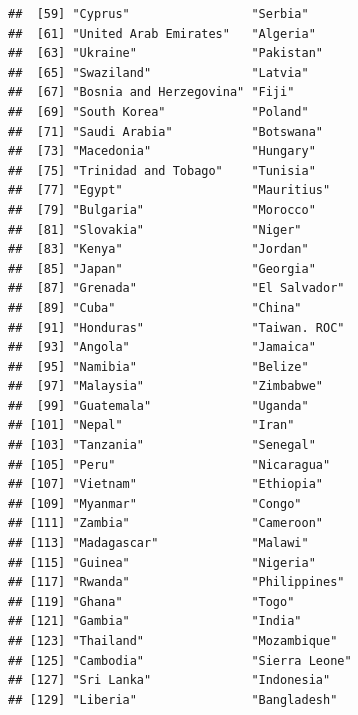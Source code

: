 \documentclass[ignorenonframetext,]{beamer}
\begin{document}
\begin{frame}[fragile]{}
\begin{verbatim}
##  [59] "Cyprus"                 "Serbia"                
##  [61] "United Arab Emirates"   "Algeria"               
##  [63] "Ukraine"                "Pakistan"              
##  [65] "Swaziland"              "Latvia"                
##  [67] "Bosnia and Herzegovina" "Fiji"                  
##  [69] "South Korea"            "Poland"                
##  [71] "Saudi Arabia"           "Botswana"              
##  [73] "Macedonia"              "Hungary"               
##  [75] "Trinidad and Tobago"    "Tunisia"               
##  [77] "Egypt"                  "Mauritius"             
##  [79] "Bulgaria"               "Morocco"               
##  [81] "Slovakia"               "Niger"                 
##  [83] "Kenya"                  "Jordan"                
##  [85] "Japan"                  "Georgia"               
##  [87] "Grenada"                "El Salvador"           
##  [89] "Cuba"                   "China"                 
##  [91] "Honduras"               "Taiwan. ROC"           
##  [93] "Angola"                 "Jamaica"               
##  [95] "Namibia"                "Belize"                
##  [97] "Malaysia"               "Zimbabwe"              
##  [99] "Guatemala"              "Uganda"                
## [101] "Nepal"                  "Iran"                  
## [103] "Tanzania"               "Senegal"               
## [105] "Peru"                   "Nicaragua"             
## [107] "Vietnam"                "Ethiopia"              
## [109] "Myanmar"                "Congo"                 
## [111] "Zambia"                 "Cameroon"              
## [113] "Madagascar"             "Malawi"                
## [115] "Guinea"                 "Nigeria"               
## [117] "Rwanda"                 "Philippines"           
## [119] "Ghana"                  "Togo"                  
## [121] "Gambia"                 "India"                 
## [123] "Thailand"               "Mozambique"            
## [125] "Cambodia"               "Sierra Leone"          
## [127] "Sri Lanka"              "Indonesia"             
## [129] "Liberia"                "Bangladesh"
\end{verbatim}

\end{frame}
\end{document}
